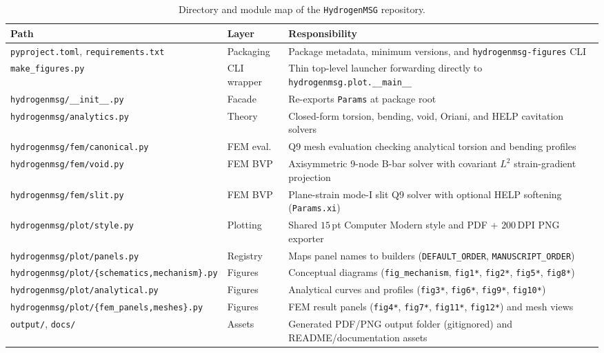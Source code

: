 \documentclass[11pt]{article}
\begin{document}
\begin{table}[!htbp]
\centering
\caption{Directory and module map of the \texttt{HydrogenMSG} repository.}
\label{tab:modules}
\footnotesize
\setlength{\tabcolsep}{5pt}
\begin{tabularx}{\textwidth}{@{}>{\raggedright\arraybackslash}l >{\raggedright\arraybackslash}l >{\raggedright\arraybackslash}X@{}}
\toprule
Path & Layer & Responsibility \\
\midrule
\texttt{pyproject.toml}, \texttt{requirements.txt} & Packaging & Package metadata, minimum versions, and \texttt{hydrogenmsg-figures} CLI \\
\texttt{make\_figures.py} & CLI wrapper & Thin top-level launcher forwarding directly to \texttt{hydrogenmsg.plot.\_\_main\_\_} \\
\texttt{hydrogenmsg/\_\_init\_\_.py} & Facade & Re-exports \texttt{Params} at package root \\
\texttt{hydrogenmsg/analytics.py} & Theory & Closed-form torsion, bending, void, Oriani, and HELP cavitation solvers \\
\texttt{hydrogenmsg/fem/canonical.py} & FEM eval. & Q9 mesh evaluation checking analytical torsion and bending profiles \\
\texttt{hydrogenmsg/fem/void.py} & FEM BVP & Axisymmetric 9-node B-bar solver with covariant $L^2$ strain-gradient projection \\
\texttt{hydrogenmsg/fem/slit.py} & FEM BVP & Plane-strain mode-I slit Q9 solver with optional HELP softening (\texttt{Params.xi}) \\
\texttt{hydrogenmsg/plot/style.py} & Plotting & Shared $15$\,pt Computer Modern style and PDF + $200$\,DPI PNG exporter \\
\texttt{hydrogenmsg/plot/panels.py} & Registry & Maps panel names to builders (\texttt{DEFAULT\_ORDER}, \texttt{MANUSCRIPT\_ORDER}) \\
\texttt{hydrogenmsg/plot/\{schematics,mechanism\}.py} & Figures & Conceptual diagrams (\texttt{fig\_mechanism}, \texttt{fig1*}, \texttt{fig2*}, \texttt{fig5*}, \texttt{fig8*}) \\
\texttt{hydrogenmsg/plot/analytical.py} & Figures & Analytical curves and profiles (\texttt{fig3*}, \texttt{fig6*}, \texttt{fig9*}, \texttt{fig10*}) \\
\texttt{hydrogenmsg/plot/\{fem\_panels,meshes\}.py} & Figures & FEM result panels (\texttt{fig4*}, \texttt{fig7*}, \texttt{fig11*}, \texttt{fig12*}) and mesh views \\
\texttt{output/}, \texttt{docs/} & Assets & Generated PDF/PNG output folder (gitignored) and README/documentation assets \\
\bottomrule
\end{tabularx}
\end{table}
\FloatBarrier
\end{document}
